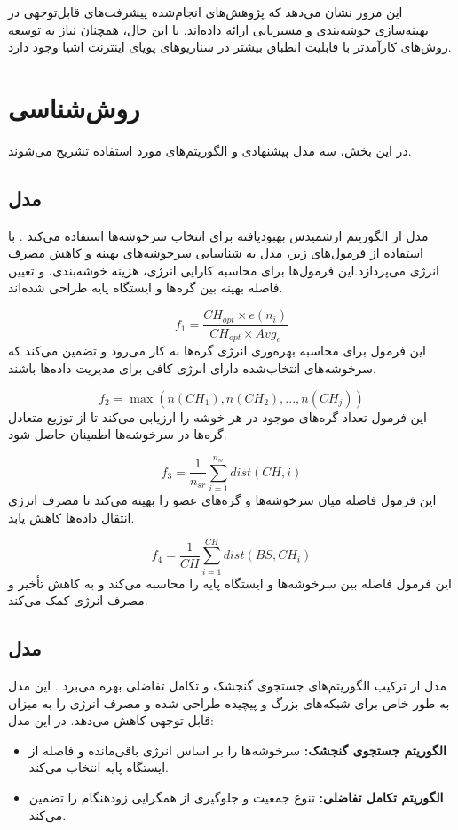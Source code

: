 \documentclass[12pt, onecolumn, a4paper]{article}
\begin{document}
	
	این مرور نشان می‌دهد که پژوهش‌های انجام‌شده پیشرفت‌های قابل‌توجهی در بهینه‌سازی خوشه‌بندی و مسیریابی ارائه داده‌اند. با این حال، همچنان نیاز به توسعه روش‌های کارآمدتر با قابلیت انطباق بیشتر در سناریوهای پویای اینترنت اشیا وجود دارد.
	
\section{روش‌شناسی}

در این بخش، سه مدل پیشنهادی و الگوریتم‌های مورد استفاده تشریح می‌شوند.

\subsection{مدل }
مدل  از الگوریتم ارشمیدس بهبودیافته برای انتخاب سرخوشه‌ها استفاده می‌کند \cite{ref4, ref5}. با استفاده از فرمول‌های زیر، مدل به شناسایی سرخوشه‌های بهینه و کاهش مصرف انرژی می‌پردازد.این فرمول‌ها برای محاسبه کارایی انرژی، هزینه خوشه‌بندی، و تعیین فاصله بهینه بین گره‌ها و ایستگاه پایه طراحی شده‌اند.

\begin{equation}
	f_1 = \frac{CH_{opt} \times e(n_i)}{CH_{opt} \times Avg_e}
\end{equation}
\noindent این فرمول برای محاسبه بهره‌وری انرژی گره‌ها به کار می‌رود و تضمین می‌کند که سرخوشه‌های انتخاب‌شده دارای انرژی کافی برای مدیریت داده‌ها باشند.

\begin{equation}
	f_2 = \max(n(CH_1), n(CH_2), ..., n(CH_j))
\end{equation}
\noindent این فرمول تعداد گره‌های موجود در هر خوشه را ارزیابی می‌کند تا از توزیع متعادل گره‌ها در سرخوشه‌ها اطمینان حاصل شود.

\begin{equation}
	f_3 = \frac{1}{n_{sr}} \sum_{i=1}^{n_{sr}} dist(CH, i)
\end{equation}
\noindent این فرمول فاصله میان سرخوشه‌ها و گره‌های عضو را بهینه می‌کند تا مصرف انرژی انتقال داده‌ها کاهش یابد.

\begin{equation}
	f_4 = \frac{1}{CH} \sum_{i=1}^{CH} dist(BS, CH_i)
\end{equation}
\noindent این فرمول فاصله بین سرخوشه‌ها و ایستگاه پایه را محاسبه می‌کند و به کاهش تأخیر و مصرف انرژی کمک می‌کند.

\subsection{مدل }
مدل  از ترکیب الگوریتم‌های جستجوی گنجشک و تکامل تفاضلی بهره می‌برد \cite{ref5, ref6}. این مدل به طور خاص برای شبکه‌های بزرگ و پیچیده طراحی شده و مصرف انرژی را به میزان قابل توجهی کاهش می‌دهد.
 در این مدل:
\begin{itemize}
	\item \textbf{الگوریتم جستجوی گنجشک:} سرخوشه‌ها را بر اساس انرژی باقی‌مانده و فاصله از ایستگاه پایه انتخاب می‌کند.
	\item \textbf{الگوریتم تکامل تفاضلی:} تنوع جمعیت و جلوگیری از همگرایی زودهنگام را تضمین می‌کند.
\end{itemize}
\end{document}
